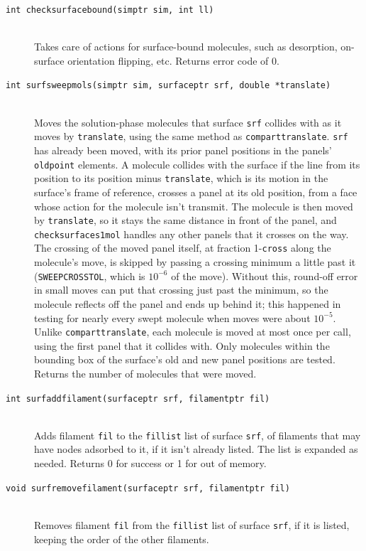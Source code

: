 \documentclass {scrbook}
\newcommand {\ttt} {\texttt}
\begin{document}
\begin{description}
\item[\ttt{int checksurfacebound(simptr sim, int ll)}]
\hfill \\
Takes care of actions for surface-bound molecules, such as desorption, on-surface orientation flipping, etc. Returns error code of 0.

\item[\ttt{int surfsweepmols(simptr sim, surfaceptr srf, double *translate)}]
\hfill \\
Moves the solution-phase molecules that surface \ttt{srf} collides with as it moves by \ttt{translate}, using the same method as \ttt{comparttranslate}. \ttt{srf} has already been moved, with its prior panel positions in the panels' \ttt{oldpoint} elements. A molecule collides with the surface if the line from its position to its position minus \ttt{translate}, which is its motion in the surface's frame of reference, crosses a panel at its old position, from a face whose action for the molecule isn't transmit. The molecule is then moved by \ttt{translate}, so it stays the same distance in front of the panel, and \ttt{checksurfaces1mol} handles any other panels that it crosses on the way. The crossing of the moved panel itself, at fraction 1-\ttt{cross} along the molecule's move, is skipped by passing a crossing minimum a little past it (\ttt{SWEEPCROSSTOL}, which is $10^{-6}$ of the move). Without this, round-off error in small moves can put that crossing just past the minimum, so the molecule reflects off the panel and ends up behind it; this happened in testing for nearly every swept molecule when moves were about $10^{-5}$. Unlike \ttt{comparttranslate}, each molecule is moved at most once per call, using the first panel that it collides with. Only molecules within the bounding box of the surface's old and new panel positions are tested. Returns the number of molecules that were moved.

\item[\ttt{int surfaddfilament(surfaceptr srf, filamentptr fil)}]
\hfill \\
Adds filament \ttt{fil} to the \ttt{fillist} list of surface \ttt{srf}, of filaments that may have nodes adsorbed to it, if it isn't already listed. The list is expanded as needed. Returns 0 for success or 1 for out of memory.

\item[\ttt{void surfremovefilament(surfaceptr srf, filamentptr fil)}]
\hfill \\
Removes filament \ttt{fil} from the \ttt{fillist} list of surface \ttt{srf}, if it is listed, keeping the order of the other filaments.


\end{description}
\end{document}
